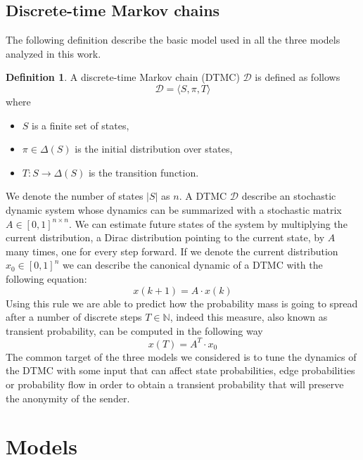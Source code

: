 \documentclass[a4paper, 11pt]{article}
\theoremstyle{definition}
\newtheorem{definition}{Definition}[section]
\theoremstyle{remark}
\begin{document}
\subsection{Discrete-time Markov chains} %
\label{sub:discrete_time_markov_chains}

The following definition describe the basic model used in all the three models analyzed in this work.

\begin{definition}\label{def:dtmc}
A discrete-time Markov chain (DTMC) $\mathcal{D}$ is defined as follows
$$ \mathcal{D} = \langle S, \pi, T \rangle $$
where
\begin{itemize}
	\item $S$ is a finite set of states,
	\item $\pi \in \Delta(S)$ is the initial distribution over states,
	\item $T: S \rightarrow \Delta(S)$ is the transition function.
\end{itemize}
\end{definition}

We denote the number of states $|S|$ as $n$. A DTMC $\mathcal{D}$ describe an stochastic dynamic system whose dynamics can be summarized with a stochastic matrix $A \in [0,1]^{n \times n}$. We can estimate future states of the system by multiplying the current distribution, a Dirac distribution pointing to the current state, by $A$ many times, one for every step forward. If we denote the current distribution $x_0 \in [0,1]^n$ we can describe the canonical dynamic of a DTMC with the following equation:
$$ x(k+1) = A \cdot x(k) $$
Using this rule we are able to predict how the probability mass is going to spread after a number of discrete steps $T \in \mathbb{N}$, indeed this measure, also known as transient probability, can be computed in the following way
$$ x(T) = A^T \cdot x_0 $$
The common target of the three models we considered is to tune the dynamics of the DTMC with some input that can affect state probabilities, edge probabilities or probability flow in order to obtain a transient probability that will preserve the anonymity of the sender.

\section{Models} %
\label{sec:models}

\end{document}
